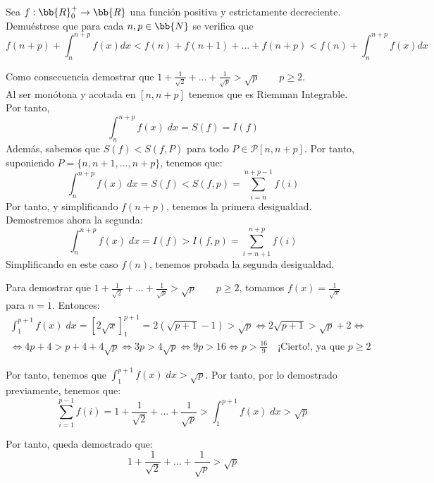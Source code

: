 \begin{ejercicio}
    Sea $f:\bb{R}^+_0\to \bb{R}$ una función positiva y estrictamente decreciente. Demuéstrese que para cada $n,p\in \bb{N}$ se verifica que
    \begin{equation*}
        f(n+p) + \int_n^{n+p} f(x)dx < f(n)+f(n+1)+\dots+f(n+p)< f(n)+ \int_n^{n+p} f(x)dx
    \end{equation*}

    Como consecuencia demostrar que $1+\frac{1}{\sqrt{2}} + \dots + \frac{1}{\sqrt{p}} > \sqrt{p}\qquad p\geq 2$.\\

    Al ser monótona y acotada en $[n,n+p]$ tenemos que es Riemman Integrable. Por tanto,
    \begin{equation*}
        \int_{n}^{n+p}f(x)\;dx = S(f) = I(f)
    \end{equation*}
    Además, sabemos que $S(f)<S(f,P)$ para todo $P\in \mathscr{P}[n,n+p]$. Por tanto, suponiendo $P=\{n,n+1,\dots, n+p\}$, tenemos que:
    \begin{equation*}
        \int_n^{n+p}f(x)\;dx = S(f) < S(f,p) = \sum_{i=n}^{n+p-1}f(i)
    \end{equation*}
    Por tanto, y simplificando $f(n+p)$, tenemos la primera desigualdad. Demostremos ahora la segunda:
    \begin{equation*}
        \int_n^{n+p}f(x)\;dx = I(f) > I(f,p) = \sum_{i=n+1}^{n+p}f(i)
    \end{equation*}
    Simplificando en este caso $f(n)$, tenemos probada la segunda desigualdad.

    \vspace{1cm}
    Para demostrar que $1+\frac{1}{\sqrt{2}} + \dots + \frac{1}{\sqrt{p}} > \sqrt{p}\qquad p\geq 2$, tomamos $f(x)=\frac{1}{\sqrt{x}}$ para $n=1$. Entonces:
    \begin{multline*}
        \int_{1}^{p+1}f(x)\;dx = \left[2\sqrt{x}\right]_1^{p+1} = 2(\sqrt{p+1}-1)>\sqrt{p} \Longleftrightarrow
        2\sqrt{p+1}>\sqrt{p}+2
        \Longleftrightarrow \\ \Longleftrightarrow
        4p+4 > p + 4 + 4\sqrt{p}
        \Longleftrightarrow 3p>4\sqrt{p} \Longleftrightarrow 9p > 16 \Longleftrightarrow p>\frac{16}{9} \quad \text{¡Cierto!, ya que $p\geq 2$}
    \end{multline*}

    Por tanto, tenemos que $\int_{1}^{p+1}f(x)\;dx>\sqrt{p}$. Por tanto, por lo demostrado previamente, tenemos que:
    \begin{equation*}
        \sum_{i=1}^{p-1}f(i) = 1+\frac{1}{\sqrt{2}} + \dots + \frac{1}{\sqrt{p}} > \int_{1}^{p+1}f(x)\;dx>\sqrt{p}
    \end{equation*}

    Por tanto, queda demostrado que:
    \begin{equation*}
        1+\frac{1}{\sqrt{2}} + \dots + \frac{1}{\sqrt{p}} > \sqrt{p}
    \end{equation*}
\end{ejercicio}


